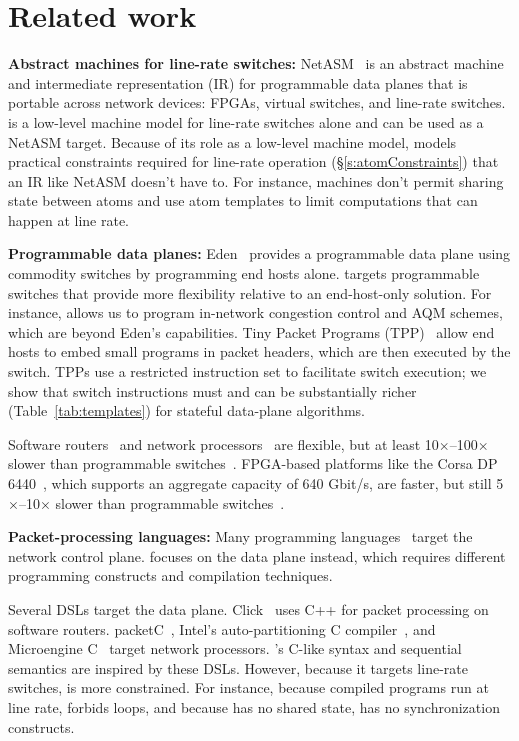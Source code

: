 \section{Related work}
\label{s:related}
\textbf{Abstract machines for line-rate switches:}
NetASM~\cite{netasm} is an abstract machine and intermediate representation
(IR) for programmable data planes that is portable across network
devices: FPGAs, virtual switches, and line-rate switches.  \absmachine is a
low-level machine model for line-rate switches alone and can be used as a
NetASM target. Because of its role as a low-level machine model, \absmachine
models practical constraints required for line-rate operation (\S\ref{s:atomConstraints}) that an IR like
NetASM doesn't have to. For instance, \absmachine machines don't permit sharing
state between atoms and use atom templates to limit computations that can
happen at line rate.

\textbf{Programmable data planes:}
Eden~\cite{eden} provides a programmable data plane using commodity switches by
programming end hosts alone. \pktlanguage targets programmable switches that
provide more flexibility relative to an end-host-only solution. For instance,
\pktlanguage allows us to program in-network congestion control and AQM
schemes, which are beyond Eden's capabilities.  Tiny Packet Programs
(TPP)~\cite{tpp} allow end hosts to embed small programs in packet headers,
which are then executed by the switch. TPPs use a restricted instruction set to
facilitate switch execution; we show that switch instructions must and can be
substantially richer (Table~\ref{tab:templates}) for stateful data-plane
algorithms.

Software routers~\cite{click, routebricks} and network processors~\cite{ixp4xx}
are flexible, but at least 10$\times$--100$\times$ slower than programmable
switches~\cite{xpliant, tofino}.  FPGA-based platforms like the Corsa DP
6440~\cite{corsa}, which supports an aggregate capacity of 640 Gbit/s, are
faster, but still 5$\times$--10$\times$ slower than programmable
switches~\cite{xpliant, tofino}.

\textbf{Packet-processing languages:} Many programming languages~\cite{frenetic, maple} target the network control plane.
\pktlanguage focuses on the data plane instead, which requires different
programming constructs and compilation techniques.

Several DSLs target the data plane. Click~\cite{click} uses C++ for packet
processing on software routers. packetC~\cite{packetc}, Intel's
auto-partitioning C compiler~\cite{intel_uiuc_pldi}, and Microengine
C~\cite{microenginec} target network processors. \pktlanguage's C-like syntax
and sequential semantics are inspired by these DSLs. However, because it targets
line-rate switches, \pktlanguage is more constrained. For instance, because
compiled programs run at line rate, \pktlanguage forbids loops, and because
\absmachine has no shared state, \pktlanguage has no synchronization constructs.


